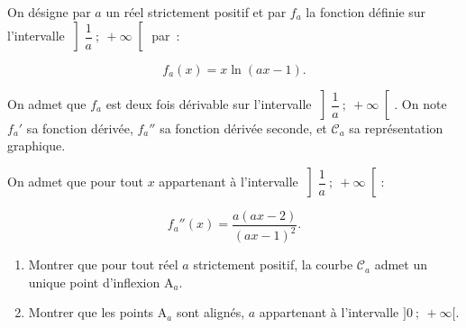 \documentclass[10pt]{article}
\begin{document}
On désigne par $a$ un réel strictement positif et par $f_a$ la fonction définie sur l'intervalle $\left]\dfrac{1}{a}~;~+\infty\right[$ par~:

\[f_a(x) = x\ln(ax - 1).\]

On admet que $f_a$ est deux fois dérivable sur l'intervalle $\left]\dfrac{1}{a}~;~+\infty\right[$. On note $f_a'$ sa fonction dérivée, $f_a''$ sa fonction dérivée seconde, et $\mathcal{C}_a$ sa représentation graphique.

On admet que pour tout $x$ appartenant à l'intervalle $\left]\dfrac{1}{a}~;~+\infty\right[$:

\[f_a''(x) = \dfrac{a(ax-2)}{(ax-1)^2}.\]

\begin{enumerate}
\item Montrer que pour tout réel $a$ strictement positif, la courbe $\mathcal{C}_a$ admet un unique point d'inflexion A$_a$.
\item Montrer que les points A$_a$ sont alignés, $a$ appartenant à l'intervalle $]0~;~+\infty[$.
\end{enumerate}
\end{document}
